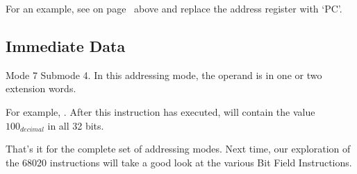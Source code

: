 For an example, see \emph{} on page~\pageref{sub-MIPreI} above and replace the address register with `PC'.


\subsection{Immediate Data}
Mode 7 Submode 4. In this addressing mode, the operand is in one or two extension words. 

For example, . After this instruction has executed,  will contain the value $100_{decimal}$ in all 32 bits.

That's it for the complete set of addressing modes. Next time, our exploration of the 68020 instructions will take a good look at the various Bit Field Instructions.

